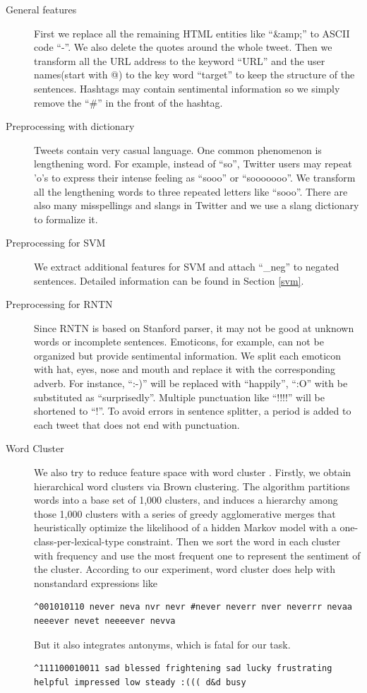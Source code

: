 \begin{description}
\item[General features] First we replace all the remaining HTML entities like ``\&amp;'' to ASCII code ``-''. We also delete the quotes around the whole tweet. Then we transform all the URL address to the keyword ``URL'' and the user names(start with @) to the key word ``target'' to keep the structure of the sentences. Hashtags may contain sentimental information so we simply remove the ``\#'' in the front of the hashtag.
\item[Preprocessing with dictionary] Tweets contain very casual language. One common phenomenon is lengthening word. For example, instead of ``so'', Twitter users may repeat 'o's to express their intense feeling as ``sooo'' or ``sooooooo''. We transform all the lengthening words to three repeated letters like ``sooo''. There are also many misspellings and slangs in Twitter and we use a slang dictionary to formalize it.
\item[Preprocessing for SVM] We extract additional features for SVM and attach ``\_neg'' to negated sentences. Detailed information can be found in Section \ref{svm}.  %
\item[Preprocessing for RNTN] Since RNTN is based on Stanford parser, it may not be good at unknown words or incomplete sentences. Emoticons, for example, can not be organized but provide sentimental information. We split each emoticon with hat, eyes, nose and mouth and replace it with the corresponding adverb. For instance, ``:-)'' will be replaced with ``happily'', ``:O'' with be substituted as ``surprisedly''. Multiple punctuation like ``!!!!'' will be shortened to ``!''. To avoid errors in sentence splitter,  a period is added to each tweet that does not end with punctuation.
\item[Word Cluster] We also try to reduce feature space with word cluster \cite{Owoputi:2013}. Firstly, we obtain hierarchical word clusters via Brown clustering. The algorithm partitions words into a base set of 1,000 clusters, and induces a hierarchy among those 1,000 clusters with a series of greedy agglomerative merges that heuristically optimize the likelihood of a hidden Markov model with a one-class-per-lexical-type constraint. Then we sort the word in each cluster with frequency and use the most frequent one to represent the sentiment of the cluster. According to our experiment, word cluster does help with nonstandard expressions like 

\begin{verbatim}
^001010110 never neva nvr nevr #never neverr nver neverrr nevaa neeever nevet neeeever nevva
\end{verbatim}

But it also integrates antonyms, which is fatal for our task.
\begin{verbatim}
^111100010011 sad blessed frightening sad lucky frustrating helpful impressed low steady :((( d&d busy
\end{verbatim}



\end{description}


